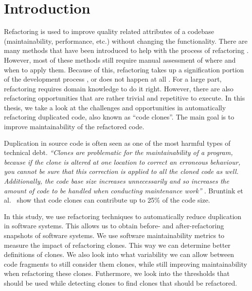\chapter{Introduction}
\label{ch:introduction}
Refactoring is used to improve quality related attributes of a codebase (maintainability, performance, etc.) without changing the functionality. There are many methods that have been introduced to help with the process of refactoring \cite{fowler2018refactoring, wake2004refactoring}. However, most of these methods still require manual assessment of where and when to apply them. Because of this, refactoring takes up a signification portion of the development process \cite{lientz1978characteristics, mens2004survey}, or does not happen at all \cite{mens2003refactoring}. For a large part, refactoring requires domain knowledge to do it right. However, there are also refactoring opportunities that are rather trivial and repetitive to execute. In this thesis, we take a look at the challenges and opportunities in automatically refactoring duplicated code, also known as ``code clones''. The main goal is to improve maintainability of the refactored code.

Duplication in source code is often seen as one of the most harmful types of technical debt. \textit{``Clones are problematic for the maintainability of a program, because if the clone is altered at one location to correct an erroneous behaviour, you cannot be sure that this correction is applied to all the cloned code as well. Additionally, the code base size increases unnecessarily and so increases the amount of code to be handled when conducting maintenance work''} \cite{ostberg2014automatically}. Bruntink et al.~\cite{bruntink2005use} show that code clones can contribute up to 25\% of the code size.

In this study, we use refactoring techniques to automatically reduce duplication in software systems. This allows us to obtain before- and after-refactoring snapshots of software systems. We use software maintainability metrics to measure the impact of refactoring clones. This way we can determine better definitions of clones. We also look into what variability we can allow between code fragments to still consider them clones, while still improving maintainability when refactoring these clones. Futhermore, we look into the thresholds that should be used while detecting clones to find clones that should be refactored.

